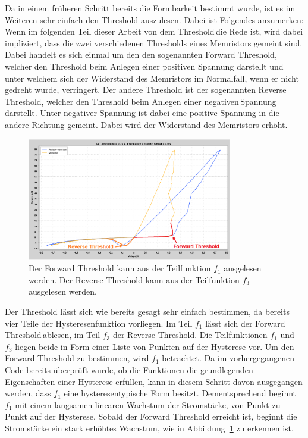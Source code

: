 Da in einem früheren Schritt bereits die Formbarkeit bestimmt wurde, ist es im Weiteren sehr einfach den Threshold auszulesen. Dabei ist Folgendes anzumerken: Wenn im folgenden Teil dieser Arbeit von \glqq dem Threshold\grqq\,die Rede ist, wird dabei impliziert, dass die zwei verschiedenen Thresholds eines Memristors gemeint sind. Dabei handelt es sich einmal um den den sogenannten \glqq Forward Threshold\grqq, welcher den Threshold beim Anlegen einer positiven Spannung darstellt und unter welchem sich der Widerstand des Memristors im Normalfall, wenn er nicht gedreht wurde, verringert. Der andere Threshold ist der sogenannten \glqq Reverse Threshold\grqq, welcher den Threshold beim Anlegen einer \glqq negativen\grqq\,Spannung darstellt. Unter negativer Spannung ist dabei eine positive Spannung in die andere Richtung gemeint. Dabei wird der Widerstand des Memristors erhöht.

\begin{figure}
  \centering
    \includegraphics[width=0.8\textwidth]{images/Threshold_Bestimmung.png}
  \caption{Der Forward Threshold kann aus der Teilfunktion $f_1$ ausgelesen werden. Der Reverse Threshold kann aus der Teilfunktion $f_3$ ausgelesen werden.}
  \label{fig:Threshold_Bestimmung}
\end{figure}


Der Threshold lässt sich wie bereits gesagt sehr einfach bestimmen, da bereits vier Teile der Hysteresenfunktion vorliegen. Im Teil $f_1$ lässt sich der \glqq Forward Threshold\grqq\,ablesen, im Teil $f_3$ der \glqq Reverse Threshold\grqq. Die Teilfunktionen $f_1$ und $f_3$ liegen beide in Form einer Liste von Punkten auf der Hysterese vor. Um den Forward Threshold zu bestimmen, wird $f_1$ betrachtet. Da im vorhergegangenen Code bereits überprüft wurde, ob die Funktionen die grundlegenden Eigenschaften einer Hysterese erfüllen, kann in diesem Schritt davon ausgegangen werden, dass $f_1$ eine hysteresentypische Form besitzt. Dementsprechend beginnt $f_1$ mit einem langsamen linearen Wachstum der Stromstärke, von Punkt zu Punkt auf der Hysterese. Sobald der Forward Threshold erreicht ist, beginnt die Stromstärke ein stark erhöhtes Wachstum, wie in Abbildung~\ref{fig:Threshold_Bestimmung} zu erkennen ist.

